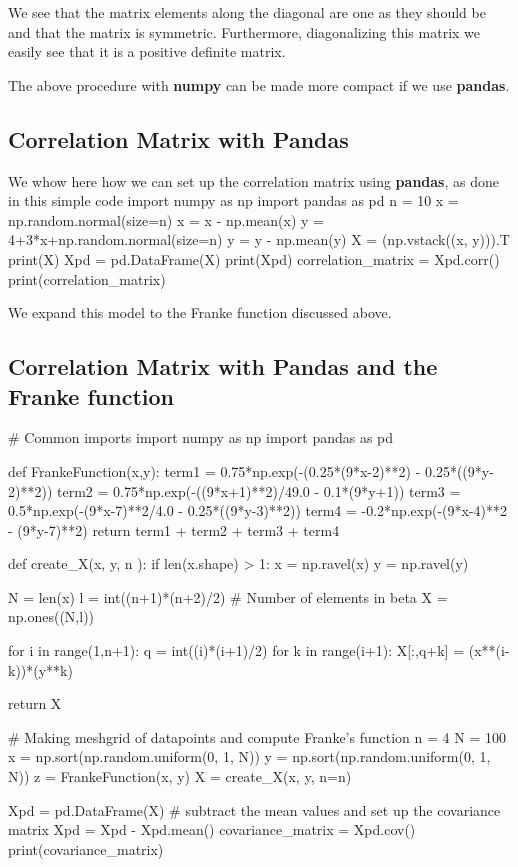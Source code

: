 \documentclass[%
oneside,                 %
final,                   %
10pt]{article}
\begin{document}
We see that the matrix elements along the diagonal are one as they
should be and that the matrix is symmetric. Furthermore, diagonalizing
this matrix we easily see that it is a positive definite matrix.

The above procedure with \textbf{numpy} can be made more compact if we use \textbf{pandas}.

\subsection{Correlation Matrix with Pandas}

We whow here how we can set up the correlation matrix using \textbf{pandas}, as done in this simple code
\bpycod
import numpy as np
import pandas as pd
n = 10
x = np.random.normal(size=n)
x = x - np.mean(x)
y = 4+3*x+np.random.normal(size=n)
y = y - np.mean(y)
X = (np.vstack((x, y))).T
print(X)
Xpd = pd.DataFrame(X)
print(Xpd)
correlation_matrix = Xpd.corr()
print(correlation_matrix)
\epycod


We expand this model to the Franke function discussed above.

\subsection{Correlation Matrix with Pandas and the Franke function}

\bpycod
# Common imports
import numpy as np
import pandas as pd


def FrankeFunction(x,y):
	term1 = 0.75*np.exp(-(0.25*(9*x-2)**2) - 0.25*((9*y-2)**2))
	term2 = 0.75*np.exp(-((9*x+1)**2)/49.0 - 0.1*(9*y+1))
	term3 = 0.5*np.exp(-(9*x-7)**2/4.0 - 0.25*((9*y-3)**2))
	term4 = -0.2*np.exp(-(9*x-4)**2 - (9*y-7)**2)
	return term1 + term2 + term3 + term4


def create_X(x, y, n ):
	if len(x.shape) > 1:
		x = np.ravel(x)
		y = np.ravel(y)

	N = len(x)
	l = int((n+1)*(n+2)/2)		# Number of elements in beta
	X = np.ones((N,l))

	for i in range(1,n+1):
		q = int((i)*(i+1)/2)
		for k in range(i+1):
			X[:,q+k] = (x**(i-k))*(y**k)

	return X


# Making meshgrid of datapoints and compute Franke's function
n = 4
N = 100
x = np.sort(np.random.uniform(0, 1, N))
y = np.sort(np.random.uniform(0, 1, N))
z = FrankeFunction(x, y)
X = create_X(x, y, n=n)    

Xpd = pd.DataFrame(X)
# subtract the mean values and set up the covariance matrix
Xpd = Xpd - Xpd.mean()
covariance_matrix = Xpd.cov()
print(covariance_matrix)
\epycod
\end{document}
